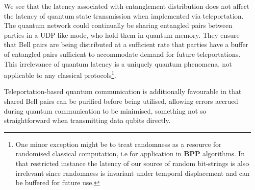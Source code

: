 We see that the latency associated with entanglement distribution does not affect the latency of quantum state transmission when implemented via teleportation. The quantum network could continually be sharing entangled pairs between parties in a UDP-like mode, who hold them in quantum memory. They ensure that Bell pairs are being distributed at a sufficient rate that parties have a buffer of entangled pairs sufficient to accommodate demand for future teleportations. This irrelevance of quantum latency is a uniquely quantum phenomena, not applicable to any classical protocols\footnote{One minor exception might be to treat randomness as a resource for randomised classical computation, i.e for application in \textbf{BPP} algorithms. In that restricted instance the latency of our source of random bit-strings is also irrelevant since randomness is invariant under temporal displacement and can be buffered for future use.}.

Teleportation-based quantum communication is additionally favourable in that shared Bell pairs can be purified before being utilised, allowing errors accrued during quantum communication to be minimised, something not so straightforward when transmitting data qubits directly.